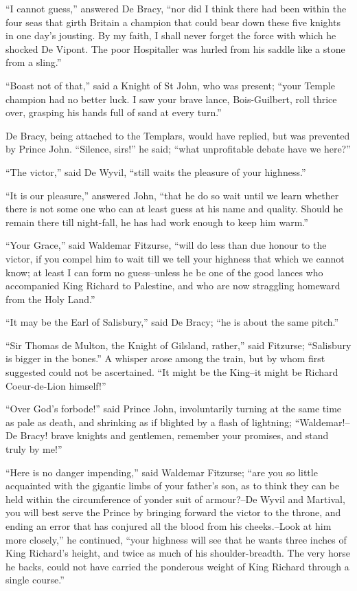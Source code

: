 ``I cannot guess,'' answered De Bracy, ``nor did I think there had been
within the four seas that girth Britain a champion that could bear down
these five knights in one day's jousting. By my faith, I shall never
forget the force with which he shocked De Vipont. The poor Hospitaller
was hurled from his saddle like a stone from a sling.''

``Boast not of that,'' said a Knight of St John, who was present; ``your
Temple champion had no better luck. I saw your brave lance,
Bois-Guilbert, roll thrice over, grasping his hands full of sand at
every turn.''

De Bracy, being attached to the Templars, would have replied, but was
prevented by Prince John. ``Silence, sirs!'' he said; ``what
unprofitable debate have we here?''

``The victor,'' said De Wyvil, ``still waits the pleasure of your
highness.''

``It is our pleasure,'' answered John, ``that he do so wait until we
learn whether there is not some one who can at least guess at his name
and quality. Should he remain there till night-fall, he has had work
enough to keep him warm.''

``Your Grace,'' said Waldemar Fitzurse, ``will do less than due honour
to the victor, if you compel him to wait till we tell your highness that
which we cannot know; at least I can form no guess--unless he be one of
the good lances who accompanied King Richard to Palestine, and who are
now straggling homeward from the Holy Land.''

``It may be the Earl of Salisbury,'' said De Bracy; ``he is about the
same pitch.''

``Sir Thomas de Multon, the Knight of Gilsland, rather,'' said Fitzurse;
``Salisbury is bigger in the bones.'' A whisper arose among the train,
but by whom first suggested could not be ascertained. ``It might be the
King--it might be Richard Coeur-de-Lion himself!''

``Over God's forbode!'' said Prince John, involuntarily turning at the
same time as pale as death, and shrinking as if blighted by a flash of
lightning; ``Waldemar!--De Bracy! brave knights and gentlemen, remember
your promises, and stand truly by me!''

``Here is no danger impending,'' said Waldemar Fitzurse; ``are you so
little acquainted with the gigantic limbs of your father's son, as to
think they can be held within the circumference of yonder suit of
armour?--De Wyvil and Martival, you will best serve the Prince by
bringing forward the victor to the throne, and ending an error that has
conjured all the blood from his cheeks.--Look at him more closely,'' he
continued, ``your highness will see that he wants three inches of King
Richard's height, and twice as much of his shoulder-breadth. The very
horse he backs, could not have carried the ponderous weight of King
Richard through a single course.''

